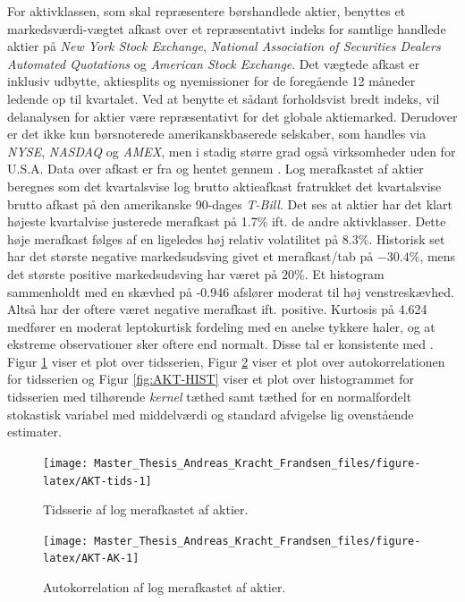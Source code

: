 \documentclass[
  a4paper,
  oneside]{memoir}
\begin{document}
For aktivklassen, som skal repræsentere børshandlede aktier, benyttes et markedsværdi-vægtet afkast over et repræsentativt indeks for samtlige handlede aktier på \emph{New York Stock Exchange}, \emph{National Association of Securities Dealers Automated Quotations} og \emph{American Stock Exchange}. Det vægtede afkast er inklusiv udbytte, aktiesplits og nyemissioner for de foregående 12 måneder ledende op til kvartalet. Ved at benytte et sådant forholdsvist bredt indeks, vil delanalysen for aktier være repræsentativt for det globale aktiemarked. Derudover er det ikke kun børsnoterede amerikanskbaserede selskaber, som handles via \emph{NYSE}, \emph{NASDAQ} og \emph{AMEX}, men i stadig større grad også virksomheder uden for U.S.A. Data over afkast er fra \citep{CRSPakt} og hentet gennem \citep{WRDSakt}. Log merafkastet af aktier beregnes som det kvartalsvise log brutto aktieafkast fratrukket det kvartalsvise brutto afkast på den amerikanske 90-dages \emph{T-Bill}. Det ses at aktier har det klart højeste kvartalvise justerede merafkast på 1.7\(\%\) ift. de andre aktivklasser. Dette høje merafkast følges af en ligeledes høj relativ volatilitet på 8.3\(\%\). Historisk set har det største negative markedsudsving givet et merafkast/tab på \(-30.4\%\), mens det største positive markedsudsving har været på \(20\%\). Et histogram sammenholdt med en skævhed på -0.946 afslører moderat til høj venstreskævhed. Altså har der oftere været negative merafkast ift. positive. Kurtosis på 4.624 medfører en moderat leptokurtisk fordeling med en anelse tykkere haler, og at ekstreme observationer sker oftere end normalt. Disse tal er konsistente med \citep{CampVic2003}. Figur \ref{fig:AKT-tids} viser et plot over tidsserien, Figur \ref{fig:AKT-AK} viser et plot over autokorrelationen for tidsserien og Figur \ref{fig:AKT-HIST} viser et plot over histogrammet for tidsserien med tilhørende \emph{kernel} tæthed samt tæthed for en normalfordelt stokastisk variabel med middelværdi og standard afvigelse lig ovenstående estimater.

\begin{figure}[H]

{\centering \texttt{[image: Master\_Thesis\_Andreas\_Kracht\_Frandsen\_files/figure-latex/AKT-tids-1]} 

}

\caption{Tidsserie af log merafkastet af aktier.}\label{fig:AKT-tids}
\end{figure}

\begin{figure}[H]

{\centering \texttt{[image: Master\_Thesis\_Andreas\_Kracht\_Frandsen\_files/figure-latex/AKT-AK-1]} 

}

\caption{Autokorrelation af log merafkastet af aktier.}\label{fig:AKT-AK}
\end{figure}
\end{document}
